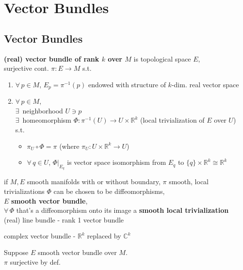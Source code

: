 \section{Vector Bundles }

\subsection*{Vector Bundles }

\textbf{ (real) vector bundle of rank $k$ over $M$ } is topological space $E$, \\
\quad surjective cont. $\pi: E \to M$ s.t.
\begin{enumerate}
\item[(i)] $\forall \, p \in M$, $E_p = \pi^{-1}(p)$ endowed with structure of $k$-dim. real vector space
\item[(ii)] $\forall \, p \in M$, \\
  $\exists \, $ neighborhood $U \ni p$ \\
  $ \exists \, $ homeomorphism $\Phi : \pi^{-1}{(U)} \to U \times \mathbb{R}^k$ (local trivialization of $E$ over $U$) \\

s.t. 

\begin{itemize}
\item $\pi_U \circ \Phi = \pi$ (where $\pi_U : U \times \mathbb{R}^k \to U$) 
\item $\forall \, q\in U$, $\left. \Phi \right|_{E_q}$ is vector space isomorphism from $E_q$ to $\lbrace q \rbrace \times \mathbb{R}^k \cong \mathbb{R}^k$
\end{itemize}
\end{enumerate}

if $M, E$ smooth manifolds with or without boundary, $\pi$ smooth, local trivializations $\Phi$ can be chosen to be diffeomorphisms, \\
$E$ \textbf{smooth vector bundle}, \\
$\forall \, \Phi$ that's a diffeomorphism onto its image a \textbf{ smooth local trivialization} \\

(real) line bundle - rank 1 vector bundle 

complex vector bundle - $\mathbb{R}^k$ replaced by $\mathbb{C}^k$

 Suppose $E$ smooth vector bundle over $M$. \\
$\pi$ surjective by def.  

